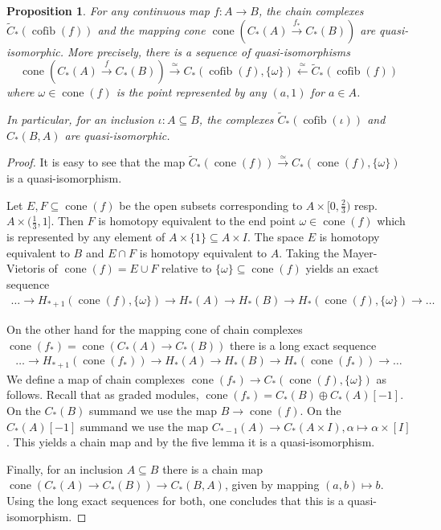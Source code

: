 \documentclass{scrartcl}
\theoremstyle{plain}
\newtheorem{proposition}[theorem]{Proposition}
\theoremstyle{definition}
\renewcommand{\subset}{\subseteq}
\newcommand{\isect}{\mathbin{\cap}}
\DeclareMathOperator{\cone}{cone}
\DeclareMathOperator{\cofib}{cofib}
\newcommand{\quiso}{\simeq}
\let\xto\xrightarrow
\let\xfrom\xleftarrow
\begin{document}
\begin{proposition}\label{prop:relative-homology-cofiber}
    For any continuous map $f\colon A\to B$, the chain complexes $\tilde C_*(\cofib(f))$ and the mapping cone $\cone(C_*(A)\xto{f_*} C_*(B))$ are quasi-isomorphic. More precisely, there is a sequence of quasi-isomorphisms 
    \[
        \cone(C_*(A)\xto{f} C_*(B)) \xto{\quiso} C_*(\cofib(f), \{\omega\}) \xfrom{\quiso} \tilde C_*(\cofib(f))
        \]
    where $\omega\in \cone(f)$ is the point represented by any $(a, 1)$ for $a\in A$.
    
    In particular, for an inclusion $\iota \colon A\subset B$, the complexes $\tilde C_*(\cofib(\iota))$ and $C_*(B, A)$ are quasi-isomorphic. 
\end{proposition}
\begin{proof}
    It is easy to see that the map $\tilde C_*(\cone(f)) \xto{\quiso} C_*(\cone(f), \{\omega\}) $ is a quasi-isomorphism. 

    Let $E, F\subset \cone(f)$ be the open subsets corresponding to $A\times [0, \frac 23)$ resp.\ $A\times (\frac 13, 1]$. Then $F$ is homotopy equivalent to the end point $\omega\in \cone(f)$ which is represented by any element of $A\times\{1\}\subset A\times I$. The space $E$ is homotopy equivalent to $B$ and $E\isect F$ is homotopy equivalent to $A$. Taking the Mayer-Vietoris of $\cone(f) = E\cup F$ relative to $\{\omega\}\subset \cone(f)$ yields an exact sequence
    \begin{align*}
        \dots\to H_{*+1}(\cone(f), \{\omega\}) \to H_*(A)\to H_*(B) \to H_*(\cone(f), \{\omega\})\to\dots
    \end{align*}
    
    On the other hand for the mapping cone of chain complexes $\cone(f_*) = \cone(C_*(A)\to C_*(B))$ there is a long exact sequence 
    \begin{align*}
        \dots\to H_{*+1}(\cone(f_*)) \to H_*(A)\to H_*(B) \to H_*(\cone(f_*))\to\dots
    \end{align*}
    We define a map of chain complexes $\cone(f_*)\to C_*(\cone(f), \{\omega\})$ as follows. Recall that as graded modules, $\cone(f_*) = C_*(B)\oplus C_*(A)[-1]$. On the $C_*(B)$ summand we use the map $B\to \cone(f)$. On the $C_*(A)[-1]$ summand we use the map $C_{*-1}(A)\to C_{*}(A\times I), \alpha\mapsto\alpha\times[I]$. This yields a chain map and by the five lemma it is a quasi-isomorphism. 

    Finally, for an inclusion $A\subset B$ there is a chain map $\cone(C_*(A)\to C_*(B))\to C_*(B, A)$, given by mapping $(a, b)\mapsto b$. Using the long exact sequences for both, one concludes that this is a quasi-isomorphism. 
\end{proof}
\end{document}
